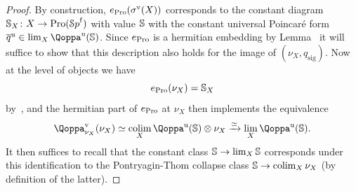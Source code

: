 \begin{proof}
By construction, $e_{\operatorname{Pro}}(\sigma^{\mathrm{v}}(X))$ corresponds to the constant diagram $\mathbb{S}_X\colon X \to \operatorname{Pro}({\mathcal Sp}^{\mathrm{f}})$ with value $\mathbb{S}$ with the constant universal Poincaré form $\ovl{q}^{\uni} \in \lim_X \QF^{\uni}(\SS)$. Since $e_{\operatorname{Pro}}$ is a hermitian embedding by Lemma~ it will suffice to show that this description also holds for the image of $(\nu_X,q_{\mathrm{sig}})$.
Now at the level of objects we have
\[
e_{\operatorname{Pro}}(\nu_X) = \mathbb{S}_X
\]
by~,
and the hermitian part of $e_{\operatorname{Pro}}$ at $\nu_X$ then implements the equivalence
\[
\QF^{\vis}_{\nu_X}(\nu_X) \simeq \colim_X\QF^{\uni}(\SS)\otimes \nu_X \xrightarrow{\simeq} \lim_X\QF^{\uni}(\SS) .
\]
It then suffices to recall that the constant class $\mathbb{S}\to \lim_X \mathbb{S}$ corresponds under this identification to the Pontryagin-Thom collapse class $\mathbb{S}\to \mathop{\mathrm{colim}}_X \nu_X$ (by definition of the latter).
\end{proof}

